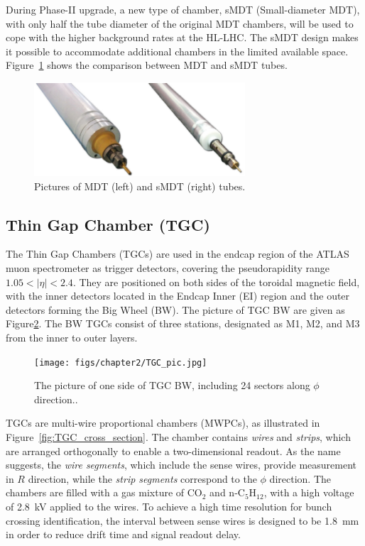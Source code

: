 During Phase-II upgrade, a new type of chamber, sMDT (Small-diameter MDT), with only half the tube diameter of the original MDT chambers, will be used to cope with the higher background rates at the HL-LHC. The sMDT design makes it possible to accommodate additional chambers in the limited available space. Figure~\ref{fig:sMDT} shows the comparison between MDT and sMDT tubes.

\begin{figure}[htbp]
  \centering
  \includegraphics[width=0.7\textwidth]{figs/chapter2/sMDT_MDT.png}
  \caption{Pictures of MDT (left) and sMDT (right) tubes.}
  \label{fig:sMDT}
\end{figure}

\subsection{Thin Gap Chamber (TGC)} \label{sec:TGC}
The Thin Gap Chambers (TGCs) are used in the endcap region of the ATLAS muon spectrometer as trigger detectors, covering the pseudorapidity range $1.05 < |\eta| < 2.4$. They are positioned on both sides of the toroidal magnetic field, with the inner detectors located in the Endcap Inner (EI) region and the outer detectors forming the Big Wheel (BW). The picture of TGC BW are given as Figure\ref{fig:TGC_pic}. The BW TGCs consist of three stations, designated as M1, M2, and M3 from the inner to outer layers.

\begin{figure}[htbp]
  \centering
  \texttt{[image: figs/chapter2/TGC\_pic.jpg]}
  \caption{The picture of one side of TGC BW, including 24 sectors along $\phi$ direction.\cite{TGCInstallation}.}
  \label{fig:TGC_pic}
\end{figure}

TGCs are multi-wire proportional chambers (MWPCs), as illustrated in Figure~\ref{fig:TGC_cross_section}. The chamber contains \textit{wires} and \textit{strips}, which are arranged orthogonally to enable a two-dimensional readout. As the name suggests, the \textit{wire segments}, which include the sense wires, provide measurement in $R$ direction, while the \textit{strip segments} correspond to the $\phi$ direction. The chambers are filled with a gas mixture of CO$_2$ and n-C$_5$H$_{12}$, with a high voltage of 2.8~kV applied to the wires. To achieve a high time resolution for bunch crossing identification, the interval between sense wires is designed to be 1.8~mm in order to reduce drift time and signal readout delay.


